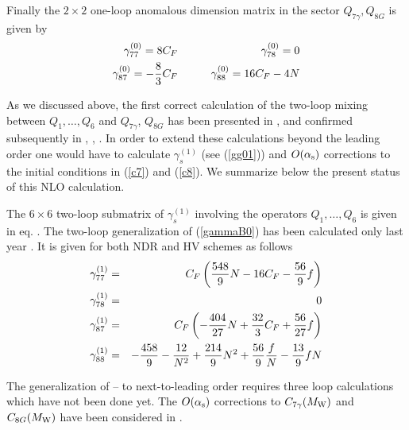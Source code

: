 Finally the $2\times 2$ one-loop anomalous dimension matrix in the
sector $Q_{7\gamma},Q_{8G}$ is given by \cite{Grin}
\begin{eqnarray}
\gamma^{(0)}_{77} = 8 C_F
&\qquad&
\gamma^{(0)}_{78} = 0
\label{gammaB0} \\
\gamma^{(0)}_{87} = -\frac{8}{3} C_F
&\qquad&
\gamma^{(0)}_{88} = 16 C_F - 4 N
\nonumber
\end{eqnarray}

As we discussed above, the first correct calculation of the two-loop
mixing between $Q_1,\ldots,Q_6$ and $Q_{7\gamma}$, $Q_{8G}$ has been
presented in \cite{CFMRS:93}, \cite{CFRS:94} and confirmed subsequently
in \cite{CCRV:94a}, \cite{CCRV:94b}, \cite{misiak:94}.  In order to
extend these calculations beyond the leading order one would have to
calculate $\gamma_s^{(1)}$ (see (\ref{gg01})) and $O(\alpha_{\rm s})$ corrections to
the initial conditions in (\ref{c7}) and (\ref{c8}). We summarize below
the present status of this NLO calculation.

The $6\times 6$ two-loop submatrix of $\gamma^{(1)}_s$ involving
the operators $Q_1,\ldots,Q_6$ is given in eq. .
The two-loop generalization of (\ref{gammaB0}) has been calculated only
last year \cite{misiakmuenz:95}. It is given for both NDR and HV
schemes as follows
\begin{eqnarray}
\gamma^{(1)}_{77} &=& 
   C_F \left(\frac{548}{9} N - 16 C_F - \frac{56}{9} f \right)
\nonumber \\
\gamma^{(1)}_{78} &=& 0
\label{gammaB1} \\
\gamma^{(1)}_{87} &=& 
   C_F \left(-\frac{404}{27} N +\frac{32}{3} C_F +\frac{56}{27} f \right)
\nonumber \\
\gamma^{(1)}_{88} &=& -\frac{458}{9} -\frac{12}{N^2}+ \frac{214}{9} N^2 +
   \frac{56}{9} \frac{f}{N} - \frac{13}{9} f N
\nonumber
\end{eqnarray}

The generalization of -- to next-to-leading
order requires three loop calculations which have not been done yet.
The $O(\alpha_{\rm s})$ corrections to $C_{7\gamma}(M_{\rm W})$ and $C_{8G}(M_{\rm W})$ have
been considered in \cite{Yao1}.

